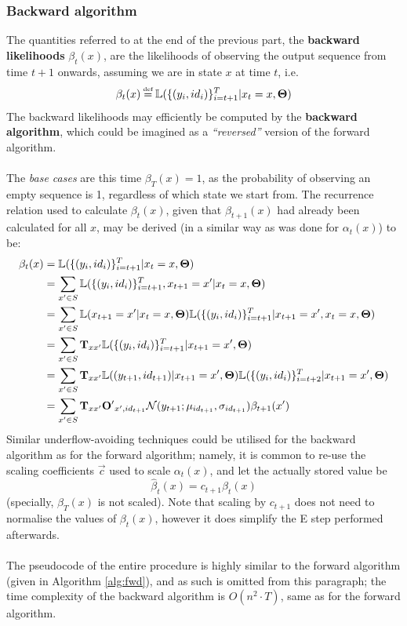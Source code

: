 \documentclass[12pt,a4paper,twoside,openright]{report}
\newcommand\myeq{\stackrel{\mathclap{\tiny\mbox{def}}}{=}}
\begin{document}
\subsubsection{Backward algorithm}

The quantities referred to at the end of the previous part, the \textbf{backward likelihoods} $\beta_t(x)$, are the likelihoods of observing the output sequence from time $t+1$ onwards, assuming we are in state $x$ at time $t$, i.e.
\[\beta_t(x) \myeq \mathbb{L}(\{(y_i, id_i)\}_{i={t+1}}^{T} | x_t = x, {\bf\Theta})\]
The backward likelihoods may efficiently be computed by the \textbf{backward algorithm}, which could be imagined as a \emph{``reversed''} version of the forward algorithm.\\ \\
The \emph{base cases} are this time $\beta_T(x) = 1$, as the probability of observing an empty sequence is 1, regardless of which state we start from. The recurrence relation used to calculate $\beta_t(x)$, given that $\beta_{t+1}(x)$ had already been calculated for all $x$, may be derived (in a similar way as was done for $\alpha_t(x)$) to be:
\[\begin{aligned}
\beta_{t}(x) & = \mathbb{L}(\{(y_i, id_i)\}_{i=t+1}^{T} | x_{t} = x, {\bf \Theta})\\
& = \sum_{x'\in S}{\mathbb{L}(\{(y_i, id_i)\}_{i=t+1}^{T}, x_{t+1} = x' | x_{t} = x, {\bf \Theta})}\\
& = \sum_{x'\in S}{\mathbb{L}(x_{t+1} = x'| x_{t} = x, {\bf \Theta})\mathbb{L}(\{(y_i, id_i)\}_{i=t+1}^{T} | x_{t+1} = x', x_{t} = x, {\bf \Theta})}\\
& = \sum_{x'\in S}{{\bf T}_{xx'}\mathbb{L}(\{(y_i, id_i)\}_{i=t+1}^{T} | x_{t+1} = x', {\bf \Theta})}\\
& = \sum_{x'\in S}{{\bf T}_{xx'}\mathbb{L}((y_{t+1}, id_{t+1}) | x_{t+1} = x', {\bf \Theta})\mathbb{L}(\{(y_i, id_i)\}_{i=t+2}^{T} | x_{t+1} = x', {\bf \Theta})}\\
& = \sum_{x'\in S}{{\bf T}_{xx'}{\bf O'}_{x',id_{t+1}}\mathcal{N}(y_{t+1}; \mu_{id_{t+1}}, \sigma_{id_{t+1}})\beta_{t+1}(x')}\\
\end{aligned}\]
Similar underflow-avoiding techniques could be utilised for the backward algorithm as for the forward algorithm; namely, it is common to re-use the scaling coefficients $\vec{c}$ used to scale $\alpha_t(x)$, and let the actually stored value be 
\[\hat{\beta}_t(x) = c_{t+1}\beta_t(x)\] 
(specially, $\beta_T(x)$ is not scaled). Note that scaling by $c_{t+1}$ does not need to normalise the values of $\beta_t(x)$, however it does simplify the E step performed afterwards.\\ \\
The pseudocode of the entire procedure is highly similar to the forward algorithm (given in Algorithm \ref{alg:fwd}), and as such is omitted from this paragraph; the time complexity of the backward algorithm is $O(n^2\cdot T)$, same as for the forward algorithm.
\end{document}
